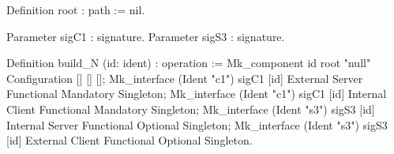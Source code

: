 Definition root : path := nil.

Parameter sigC1 : signature.
Parameter sigS3 : signature.

Definition build_N (id: ident) : operation := 
  Mk_component id root "null" Configuration [] [] [];
  Mk_interface (Ident "c1") sigC1 [id] External 
               Server Functional Mandatory Singleton;
  Mk_interface (Ident "c1") sigC1 [id] Internal
               Client Functional Mandatory Singleton;
  Mk_interface (Ident "s3") sigS3 [id] Internal
               Server Functional Optional Singleton;
  Mk_interface (Ident "s3") sigS3 [id] External 
               Client Functional Optional Singleton.